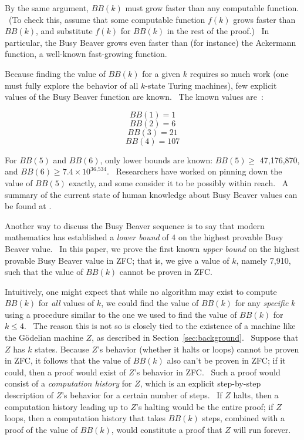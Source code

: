 \documentclass[11pt]{article}
\newcommand{\statenumcomma}{7,910, }
\begin{document}
By the same argument, $BB(k)$ must grow faster than any computable function. \ (To check this, assume that some computable function $f(k)$ grows faster than $BB(k)$, and substitute $f(k)$ for $BB(k)$ in the rest of the proof.) \ In particular, the Busy Beaver grows even faster than (for instance) the Ackermann function, a well-known fast-growing function.

Because finding the value of $BB(k)$ for a given $k$ requires so much work (one must fully explore the behavior of all $k$-state Turing machines), few explicit values of the Busy Beaver function are known. \ The known values are~\cite{bbfour,bbsmall}:

$$BB(1) = 1$$
$$BB(2) = 6$$
$$BB(3) = 21$$
$$BB(4) = 107$$

For $BB(5)$ and $BB(6)$, only lower bounds are known: $BB(5) \ge$ 47,176,870, and $BB(6) \ge 7.4 \times 10^{\textrm{36,534}}$. \ Researchers have worked on pinning down the value of $BB(5)$ exactly, and some consider it to be possibly within reach. \ A summary of the current state of human knowledge about Busy Beaver values can be found at \cite{bbvalues}.

Another way to discuss the Busy Beaver sequence is to say that modern mathematics has established a \emph{lower bound} of $4$ on the highest provable Busy Beaver value. \ In this paper, we prove the first known \emph{upper bound} on the highest provable Busy Beaver value in ZFC; that is, we give a value of $k$, namely \statenumcomma such that the value of $BB(k)$ cannot be proven in ZFC.

Intuitively, one might expect that while no algorithm may exist to compute $BB(k)$ for \emph{all} values of $k$, we could find the value of $BB(k)$ for any \emph{specific} $k$ using a procedure similar to the one we used to find the value of $BB(k)$ for $k \le 4$. \ The reason this is not so is closely tied to the existence of a machine like the G\"{o}delian machine $Z$, as described in Section~\ref{sec:background}. \ Suppose that $Z$ has $k$ states. Because $Z$'s behavior (whether it halts or loops) cannot be proven in ZFC, it follows that the value of $BB(k)$ also can't be proven in ZFC; if it could, then a proof would exist of $Z$'s behavior in ZFC. \ Such a proof would consist of a \emph{computation history} for $Z$, which is an explicit step-by-step description of $Z$'s behavior for a certain number of steps. \ If $Z$ halts, then a computation history leading up to $Z$'s halting would be the entire proof; if $Z$ loops, then a computation history that takes $BB(k)$ steps, combined with a proof of the value of $BB(k)$, would constitute a proof that $Z$ will run forever.
\end{document}
